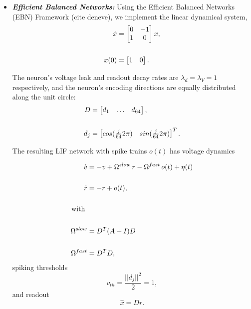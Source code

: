 \documentclass{article}
\numberwithin{equation}{section}
\begin{document}
\begin{itemize}
\item \textit{\textbf{Efficient Balanced Networks:}} Using the Efficient Balanced Networks (EBN) Framework (cite deneve), we implement the linear dynamical system,
\begin{align}
\dot{x} &= 
\begin{bmatrix}  
0 & -1 \\
1 & 0
\end{bmatrix}
x, \notag
\\ 
\\ \notag
x(0) &= \begin{bmatrix}1 & 0 \end{bmatrix}.
\end{align}

The neuron's voltage leak and readout decay rates are  $\lambda_d = \lambda_V =  1$ respectively, and the neuron's encoding directions are equally distributed along the unit circle:
\begin{align}
D &= \begin{bmatrix} d_1 & \hdots & d_{64} \end{bmatrix}, \notag
\\
\\
d_j &=  \notag
\begin{bmatrix}
cos(\frac{j}{64} 2 \pi) &
sin(\frac{j}{64} 2 \pi) 
\end{bmatrix}^T.
\end{align}

The resulting LIF network with spike trains $o(t)$ has voltage dynamics

\begin{align}
\dot{v} &= -v + \Omega^{slow} \,  r - \Omega^{fast} \, o(t) + \eta(t) 
\\ \notag
\\ 
\dot{r} &= -r + o(t),
\\ \notag
\\\notag
\text{with }
\\\notag
\\
\Omega^{slow} &= D^T (A + I) D  \notag
\\\
\label{eq:kernels}
\\\notag
\Omega^{fast} &= D^T D,
\end{align} 
spiking thresholds 
\begin{equation}
v_{th} = \frac{||d_j||^2}{2} = 1,
\end{equation} and readout 
\begin{equation}
\hat{x} = D r. 
\end{equation}


\end{itemize}
\end{document}
